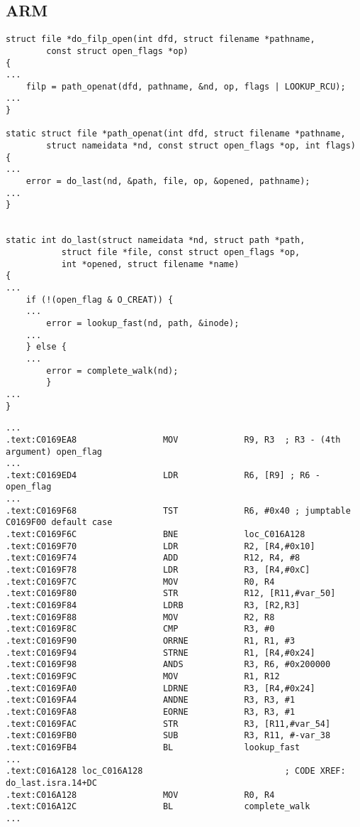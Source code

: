\subsection{ARM}


\begin{lstlisting}[caption=linux kernel 3.8.0]
struct file *do_filp_open(int dfd, struct filename *pathname,
		const struct open_flags *op)
{
...
	filp = path_openat(dfd, pathname, &nd, op, flags | LOOKUP_RCU);
...
}

static struct file *path_openat(int dfd, struct filename *pathname,
		struct nameidata *nd, const struct open_flags *op, int flags)
{
...
	error = do_last(nd, &path, file, op, &opened, pathname);
...
}


static int do_last(struct nameidata *nd, struct path *path,
		   struct file *file, const struct open_flags *op,
		   int *opened, struct filename *name)
{
...
	if (!(open_flag & O_CREAT)) {
    ...
		error = lookup_fast(nd, path, &inode);
    ...
	} else {
    ...
		error = complete_walk(nd);
        }
...
}
\end{lstlisting}


\begin{lstlisting}[caption=do\_last() (vmlinux)]
...
.text:C0169EA8                 MOV             R9, R3  ; R3 - (4th argument) open_flag
...
.text:C0169ED4                 LDR             R6, [R9] ; R6 - open_flag
...
.text:C0169F68                 TST             R6, #0x40 ; jumptable C0169F00 default case
.text:C0169F6C                 BNE             loc_C016A128
.text:C0169F70                 LDR             R2, [R4,#0x10]
.text:C0169F74                 ADD             R12, R4, #8
.text:C0169F78                 LDR             R3, [R4,#0xC]
.text:C0169F7C                 MOV             R0, R4
.text:C0169F80                 STR             R12, [R11,#var_50]
.text:C0169F84                 LDRB            R3, [R2,R3]
.text:C0169F88                 MOV             R2, R8
.text:C0169F8C                 CMP             R3, #0
.text:C0169F90                 ORRNE           R1, R1, #3
.text:C0169F94                 STRNE           R1, [R4,#0x24]
.text:C0169F98                 ANDS            R3, R6, #0x200000
.text:C0169F9C                 MOV             R1, R12
.text:C0169FA0                 LDRNE           R3, [R4,#0x24]
.text:C0169FA4                 ANDNE           R3, R3, #1
.text:C0169FA8                 EORNE           R3, R3, #1
.text:C0169FAC                 STR             R3, [R11,#var_54]
.text:C0169FB0                 SUB             R3, R11, #-var_38
.text:C0169FB4                 BL              lookup_fast
...
.text:C016A128 loc_C016A128                            ; CODE XREF: do_last.isra.14+DC
.text:C016A128                 MOV             R0, R4
.text:C016A12C                 BL              complete_walk
...
\end{lstlisting}

